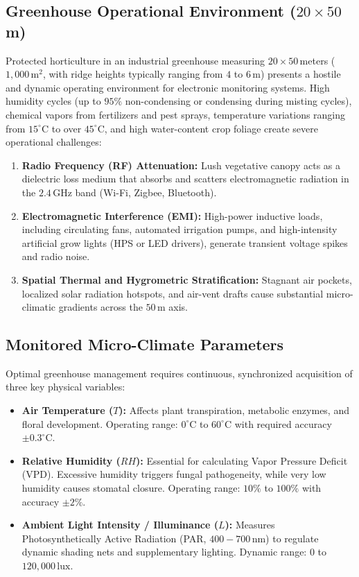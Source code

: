 \documentclass[12pt]{article}
\begin{document}
\subsection{Greenhouse Operational Environment \texorpdfstring{($20 \times 50$\,m)}{(20x50m)}}
Protected horticulture in an industrial greenhouse measuring $20 \times 50$\,meters ($1{,}000\,\text{m}^2$, with ridge heights typically ranging from $4$ to $6$\,m) presents a hostile and dynamic operating environment for electronic monitoring systems. High humidity cycles (up to $95\%$ non-condensing or condensing during misting cycles), chemical vapors from fertilizers and pest sprays, temperature variations ranging from $15^\circ\text{C}$ to over $45^\circ\text{C}$, and high water-content crop foliage create severe operational challenges:
\begin{enumerate}
    \item \textbf{Radio Frequency (RF) Attenuation:} Lush vegetative canopy acts as a dielectric loss medium that absorbs and scatters electromagnetic radiation in the $2.4\,\text{GHz}$ band (Wi-Fi, Zigbee, Bluetooth).
    \item \textbf{Electromagnetic Interference (EMI):} High-power inductive loads, including circulating fans, automated irrigation pumps, and high-intensity artificial grow lights (HPS or LED drivers), generate transient voltage spikes and radio noise.
    \item \textbf{Spatial Thermal and Hygrometric Stratification:} Stagnant air pockets, localized solar radiation hotspots, and air-vent drafts cause substantial micro-climatic gradients across the $50$\,m axis.
\end{enumerate}

\subsection{Monitored Micro-Climate Parameters}
Optimal greenhouse management requires continuous, synchronized acquisition of three key physical variables:
\begin{itemize}
    \item \textbf{Air Temperature ($T$):} Affects plant transpiration, metabolic enzymes, and floral development. Operating range: $0^\circ\text{C}$ to $60^\circ\text{C}$ with required accuracy $\pm 0.3^\circ\text{C}$.
    \item \textbf{Relative Humidity ($RH$):} Essential for calculating Vapor Pressure Deficit (VPD). Excessive humidity triggers fungal pathogeneity, while very low humidity causes stomatal closure. Operating range: $10\%$ to $100\%$ with accuracy $\pm 2\%$.
    \item \textbf{Ambient Light Intensity / Illuminance ($L$):} Measures Photosynthetically Active Radiation (PAR, $400 - 700\,\text{nm}$) to regulate dynamic shading nets and supplementary lighting. Dynamic range: $0$ to $120{,}000\,\text{lux}$.
\end{itemize}
\end{document}
